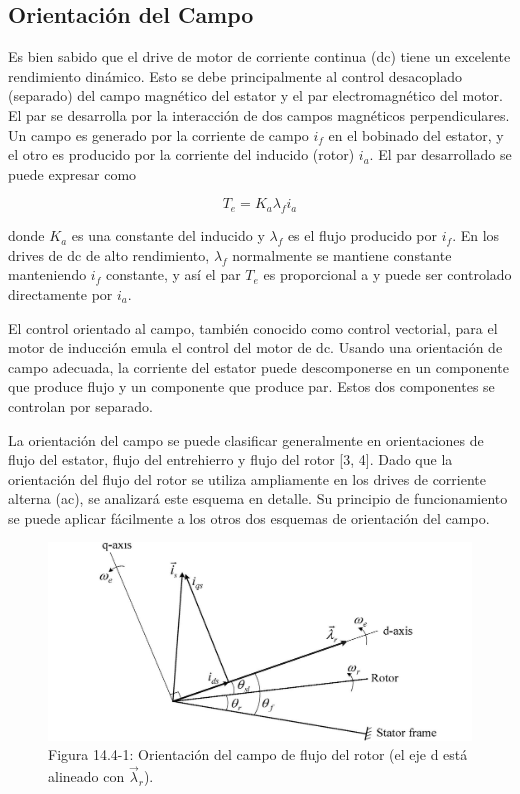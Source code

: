 \documentclass[letterpaper,12pt]{article}
\begin{document}
\subsection{Orientación del Campo}

Es bien sabido que el drive de motor de corriente continua (dc) tiene un excelente rendimiento dinámico. Esto se debe principalmente al control desacoplado (separado) del campo magnético del estator y el par electromagnético del motor. El par se desarrolla por la interacción de dos campos magnéticos perpendiculares. Un campo es generado por la corriente de campo $i_f$ en el bobinado del estator, y el otro es producido por la corriente del inducido (rotor) $i_a$. El par desarrollado se puede expresar como

\begin{equation}
T_e = K_a \lambda_f i_a \tag{14.4-1}
\end{equation}

donde $K_a$ es una constante del inducido y $\lambda_f$ es el flujo producido por $i_f$. En los drives de dc de alto rendimiento, $\lambda_f$ normalmente se mantiene constante manteniendo $i_f$ constante, y así el par $T_e$ es proporcional a y puede ser controlado directamente por $i_a$.

El control orientado al campo, también conocido como control vectorial, para el motor de inducción emula el control del motor de dc. Usando una orientación de campo adecuada, la corriente del estator puede descomponerse en un componente que produce flujo y un componente que produce par. Estos dos componentes se controlan por separado.

La orientación del campo se puede clasificar generalmente en orientaciones de flujo del estator, flujo del entrehierro y flujo del rotor [3, 4]. Dado que la orientación del flujo del rotor se utiliza ampliamente en los drives de corriente alterna (ac), se analizará este esquema en detalle. Su principio de funcionamiento se puede aplicar fácilmente a los otros dos esquemas de orientación del campo.

\begin{figure}[ht]
\centering
\includegraphics{graficos/img11.jpg}
\caption{Figura 14.4-1: Orientación del campo de flujo del rotor (el eje d está alineado con $\vec{\lambda}_r$).}
\end{figure}
\FloatBarrier
\end{document}
